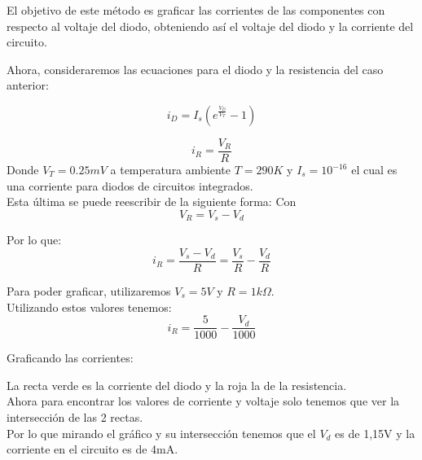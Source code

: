 \documentclass[11pt,fancy,lang=es]{elegantbook}
\begin{document}
\begin{remark}
    El objetivo de este método es graficar las corrientes de las componentes con respecto al voltaje del diodo, obteniendo así el voltaje del diodo y la corriente del circuito.\\
\end{remark}

Ahora, consideraremos las ecuaciones para el diodo y la resistencia del caso anterior:

\begin{equation*}
    i_D = I_s(e^{{\frac{V_D}{V_T}}}-1)
\end{equation*}

\begin{equation*}
    i_R = \frac{V_R}{R}
\end{equation*}
Donde $V_T = 0.25mV$ a temperatura ambiente $ T = 290K $ y $ I_s = 10^{-16}$ el cual es una corriente para diodos de circuitos integrados.\\

Esta última se puede reescribir de la siguiente forma:
Con\begin{equation*}
    V_R = V_s - V_d
\end{equation*}

Por lo que:
\begin{equation*}
    i_R = \frac{V_s - V_d}{R} = \frac{V_s}{R}- \frac{V_d}{R}
\end{equation*}

Para poder graficar, utilizaremos $V_s = 5V$ y $R= 1k\Omega$.\\

Utilizando estos valores tenemos:
\begin{equation*}
    i_R = \frac{5}{1000}- \frac{V_d}{1000}
\end{equation*}

\newpage
Graficando las corrientes:

\iffalse
    \begin{figure}[!h]
        \centering
        \texttt{[image: image/metodoGrafico.png]}
        \caption{Gráfico $I$ vs $V_d$}
        \label{fig:my_label}
    \end{figure}
\fi

La recta verde es la corriente del diodo y la roja la de la resistencia.\\
Ahora para encontrar los valores de corriente y voltaje solo tenemos que ver la intersección de las 2 rectas.\\

Por lo que mirando el gráfico y su intersección tenemos que el $V_d$ es de 1,15V y la corriente en el circuito es de 4mA.\\
\end{document}
